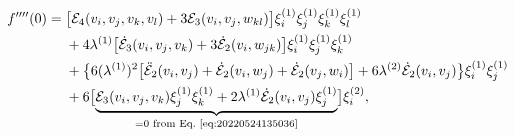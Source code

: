 \documentclass[12pt, final]{scrartcl}
\theoremstyle{definition}
\newcommand{\E}{\mathcal E}
\newcommand{\order}[2][1]{#2^{(#1)}}
\begin{document}
\begin{equation*}
  \begin{aligned}[b]
    f''''(0) ={}
    & \bigl[ \E_4(v_i, v_j, v_k , v_l) + 3\E_3(v_i, v_j, w_{k l}) \bigr] \order[1]{\xi_i} \order[1]{\xi_j} \order[1]{\xi_k} \order[1]{\xi_l}\\
    & + 4 \order[1]\lambda \bigl[\dot{\E}_3(v_i, v_j, v_k) + 3 \dot{\E}_2(v_i, w_{j k})\bigr] \order[1]{\xi_i} \order[1]{\xi_j} \order[1]{\xi_k}\\
    & + \bigl\{6 ( \order[1]\lambda )^2 \bigl[ \ddot{\E}_2 (v_i, v_j) + \dot{\E}_2(v_i, w_j) + \dot{\E}_2(v_j, w_i) \bigr] + 6\order[2]\lambda \dot{\E}_2(v_i, v_j) \bigr\} \order[1]{\xi_i} \order[1]{\xi_j}\\
    & + 6\bigl[ \underbrace{\E_3(v_i, v_j, v_k) \order[1]{\xi_j} \order[1]{\xi_k} + 2 \order[1]\lambda \dot{\E}_2(v_i, v_j) \order[1]{\xi_j}}_{=0\text{ from Eq.~\eqref{eq:20220524135036}}} \bigr] \order[2]{\xi_i},
  \end{aligned}
\end{equation*}
\end{document}
